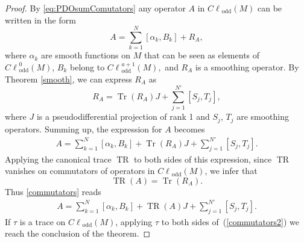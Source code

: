 \documentclass[11pt]{article}
\DeclareMathOperator{\TR}{TR} \DeclareMathOperator{\Op}{Op}
\DeclareMathOperator{\Tr}{Tr} \DeclareMathOperator{\ord}{ord}
\DeclareMathOperator{\odd}{odd} \DeclareMathOperator{\supp}{supp}
\def \Cl {{C\ell}}
\begin{document}
\begin{proof}
By \eqref{eq:PDOsumComutators} any operator $A$ in $\Cl_{\odd}(M)$ can be written in the form
\[
A=\sum\limits_{k=1}^{N}[\alpha_k,B_k]+R_A,
\]
where $\alpha_k$ are smooth functions on $M$ that can be seen as elements of $\Cl^0_{\odd}(M)$, $B_k$ belong to $\Cl^{a+1}_{\odd}(M),$ and $R_A$ is a smoothing operator.
By Theorem \ref{smooth}, we can express $R_A$ as
\[
R_A=\Tr(R_A)J+\sum_{j=1}^{N'}[S_j,T_j],
\]
where $J$ is a pseudodif\/ferential projection of rank 1 and $S_j$, $T_j$ are smoothing operators. Summing up, the expression for $A$ becomes
\begin{gather}
A=\sum\limits_{k=1}^{N}[\alpha_k,B_k]+\Tr(R_A)J+\sum_{j=1}^{N'}[S_j,T_j]. \label{commutators}
\end{gather}
Applying the canonical trace $\TR$ to both sides of this expression, since $\TR$ vanishes on commutators of operators in $\Cl_{\odd}(M)$, we infer that
\[
\TR(A)=\Tr(R_A).
\]
Thus \eqref{commutators} reads
\begin{gather}
A=\sum\limits_{k=1}^{N}[\alpha_k,B_k]+\TR(A)J+\sum_{j=1}^{N'}[S_j,T_j]. \label{commutators2}
\end{gather}
If $\tau$ is a trace on $\Cl_{\odd}(M)$, applying $\tau$ to both sides of~(\ref{commutators2}) we reach the conclusion of the theorem.
\end{proof}
\end{document}
